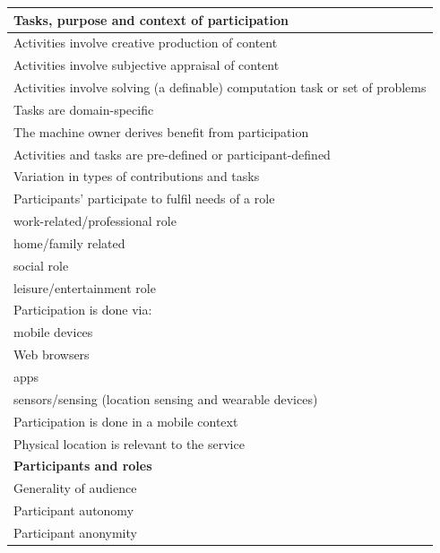 \documentclass{sig-alternate}
\begin{document}
\begin{table}[htb]
\begin{center}
\begin{scriptsize}
\begin{tabular}{|p{8cm}|}
\hline
{\bf Tasks, purpose and context of participation} \\
\hline
Activities involve creative production of content \\
Activities involve subjective appraisal of content \\
Activities involve solving (a definable) computation task or set of problems\\
Tasks are domain-specific \\
The machine owner derives benefit from participation \\
Activities and tasks are pre-defined or participant-defined \\
Variation in types of contributions and tasks \\
Participants' participate to fulfil needs of a role \\
\hspace{1cm} work-related/professional role \\
\hspace{1cm} home/family related \\
\hspace{1cm} social role \\
\hspace{1cm} leisure/entertainment role \\
Participation is done via: \\
\hspace{1cm} mobile devices \\
\hspace{1cm} Web browsers \\
\hspace{1cm} apps \\
\hspace{1cm} sensors/sensing (location sensing and wearable devices) \\
Participation is done in a mobile context \\
\hspace{1cm} Physical location is relevant to the service \\
\hline
{\bf Participants and roles} \\
\hline
Generality of audience \\
Participant autonomy \\
Participant anonymity \\

\end{tabular}
\end{scriptsize}
\end{center}
\end{table}
\end{document}
